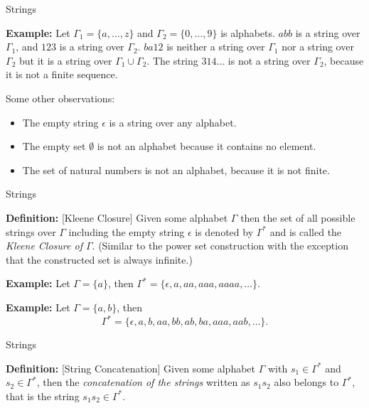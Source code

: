 \documentclass{beamer}
\begin{document}
\begin{frame}[fragile]{Strings}

\small

{\bf Example:}    Let $\Gamma_1 = \{a, \ldots, z\}$ and $\Gamma_2 = \{0,\dots, 9\}$ is alphabets. $abb$ is a string over $\Gamma_1$, and $123$ is a string over $\Gamma_2$. $ba12$ is neither a string over $\Gamma_1$ nor a string over $\Gamma_2$ but it is a string over $\Gamma_1\cup\Gamma_2$.
The string $314 \ldots$ is not a string over $\Gamma_2$, because it is not a finite sequence.

\vspace{.1in}

Some other observations:
\begin{itemize}
\item The empty string  $\epsilon$ is a string over any alphabet.
\item The empty set $\emptyset$ is not an alphabet because it contains no element.
\item The set of natural numbers is not an alphabet, because it is not finite.
\end{itemize}
\end{frame}

\begin{frame}[fragile]{Strings}

{\bf Definition:} [Kleene Closure] Given some alphabet $\Gamma$ then the set of all possible strings over
$\Gamma$ including the empty string $\epsilon$ is denoted by $\Gamma^*$ and is called the {\em Kleene
Closure of $\Gamma$}.  (Similar to the power set construction with the exception that the constructed set is always infinite.)

\vspace{.1in}
{\bf Example:} Let $\Gamma = \{ a \}$, then $\Gamma^* = \{\epsilon, a, aa, aaa, aaaa,\dots\}$.

\vspace{.1in}
{\bf Example:} Let $\Gamma = \{a,b\}$, then
\[
\Gamma^* = \{\epsilon,a,b,aa,bb,ab,ba,aaa,aab,\ldots\}.
\]
\end{frame}

\begin{frame}[fragile]{Strings}

{\bf Definition:} [String Concatenation] Given some alphabet $\Gamma$ with $s_1\in\Gamma^*$ and $s_2\in\Gamma^*$,
then the {\em concatenation of the strings} written as $s_1s_2$ also belongs to $\Gamma^*$, that is
the string $s_1s_2\in\Gamma^*$.
\end{frame}
\end{document}
